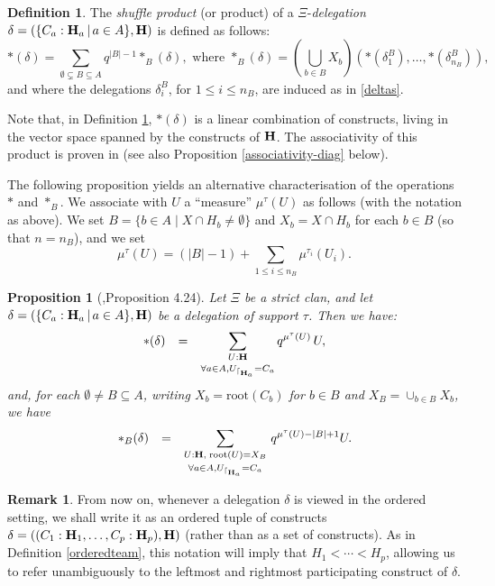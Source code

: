 \documentclass{article}
\theoremstyle{plain}
\newtheorem{proposition}[thm]{Proposition}
\newcommand{\incs}{\subsetneq}
\theoremstyle{definition}
\newtheorem{definition}[thm]{Definition}
\newtheorem{remark}[thm]{Remark}
\newcommand{\inc}{\subseteq}
\newcommand{\Union}{\bigcup}
\newcommand{\set}[1]{\{#1\}}
\newcommand{\setc}[2]{\set{#1 \mid #2}}
\newcommand{\hyper}[1]{{\bf #1}}
\newcommand{\restrconstr}[2]{{#1}_{\lceil_{#2}}}
\begin{document}
\begin{definition}\label{shp}
 The {\it shuffle product} (or product) of a $\Xi$-\emph{delegation} $\delta=(\{C_a:{\bf H}_a\,|\, a\in A\},{\bf H})$ is defined as follows:
\begin{equation} \label{shuffle-antistrict-def} 
\ast(\delta)= \sum_{\emptyset\incs B\subseteq A} q^{{|B|}-1}\ast_B(\delta), \mbox{ where } \ast_B(\delta)=(\Union_{b\in B}X_b)(\ast(\delta^B_1),\dots,\ast(\delta^B_{n_{B}})), 
\end{equation}
and where the delegations $\delta_i^B$, for $1\leq i\leq n_B$, are induced as in \eqref{deltas}.
\end{definition}
 Note that, in Definition \ref{shp}, $\ast(\delta)$ is a linear combination of constructs, living in the vector space spanned by the constructs of $\hyper{H}$. The associativity of this product is proven in \cite[Theorem 4.17]{PLBJ1} (see also Proposition \ref{associativity-diag} below). 
 
\medskip

The following proposition yields an alternative characterisation of the operations $\ast$ and $\ast_B$. We associate with $U$ a ``measure'' $\mu^\tau(U)$ as follows (with the notation as above). We set $B=\setc{b\in A}{X\cap H_b\neq\emptyset}$ and $X_b=X\cap H_b$ for each $b\in B$ (so that $n=n_B$), and we set
$$\mu^\tau(U)=(|B|-1)+ \sum_{1\leq i\leq n_B}\mu^{\tau_i}(U_i).$$
\begin{proposition}[\cite{PLBJ1},Proposition 4.24] \label{restriction-product-characterisation} Let $\Xi$ be a strict clan, and
let $\delta=(\{C_a:{\bf H}_a\,|\, a\in A\},{\bf H})$ be a delegation of support $\tau$. Then we have:
$$\begin{array}{lll} 
\ast(\delta)& = & \displaystyle\sum_{\substack {U:\hyper{H} \\[0.1cm] \forall a\in A, \restrconstr{U}{\hyper{H}_a}=C_a}} q^{\mu^\tau(U)}\, U,
\end{array}$$
and, for each $\emptyset\neq B\inc A$, writing $X_b=\textrm{root}(C_b)$ for $b\in B$ and $X_B=\cup_{b\in B}X_b$, we have 
$$\begin{array}{lll} 
\ast_B(\delta)& = &\displaystyle \sum_{\substack{U:\hyper{H},\; \textrm{root}(U)= X_B \\[0.1cm] \forall a\in A, \restrconstr{U}{\hyper{H}_a}=C_a}} \, q^{\mu^\tau(U)-|B|+1} U.
\end{array}$$
\end{proposition}


\begin{remark} \label{ordered-delegation}
From now on, whenever a delegation $\delta$ is viewed in the ordered setting, we shall write it as an ordered tuple of constructs $\delta=((C_1:{\bf H}_1,\dots,C_p:{\bf H}_p),{\bf H})$ (rather than as a set of constructs). As in Definition \ref{orderedteam}, this notation will imply that $H_1<\cdots < H_p$, allowing us to refer unambiguously to the leftmost and rightmost participating construct of $\delta$. 
\end{remark}
\end{document}
